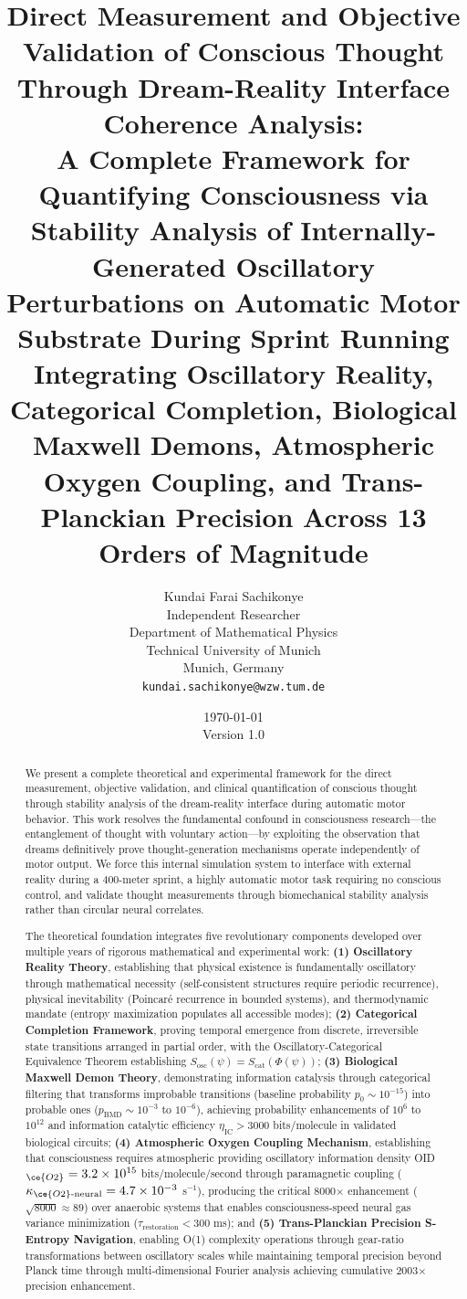 \documentclass[11pt,onecolumn]{article}
\title{\textbf{Direct Measurement and Objective Validation of Conscious Thought Through Dream-Reality Interface Coherence Analysis: \\[0.5em]
A Complete Framework for Quantifying Consciousness via Stability Analysis of Internally-Generated Oscillatory Perturbations on Automatic Motor Substrate During Sprint Running\\[0.5em]
Integrating Oscillatory Reality, Categorical Completion, Biological Maxwell Demons, Atmospheric Oxygen Coupling, and Trans-Planckian Precision Across 13 Orders of Magnitude}}
\author{
Kundai Farai Sachikonye\\
Independent Researcher\\
Department of Mathematical Physics\\
Technical University of Munich\\
Munich, Germany\\
\texttt{kundai.sachikonye@wzw.tum.de}
}
\date{\today\\[1em]Version 1.0}
\begin{document}
\maketitle

\begin{abstract}
We present a complete theoretical and experimental framework for the direct measurement, objective validation, and clinical quantification of conscious thought through stability analysis of the dream-reality interface during automatic motor behavior. This work resolves the fundamental confound in consciousness research---the entanglement of thought with voluntary action---by exploiting the observation that dreams definitively prove thought-generation mechanisms operate independently of motor output. We force this internal simulation system to interface with external reality during a 400-meter sprint, a highly automatic motor task requiring no conscious control, and validate thought measurements through biomechanical stability analysis rather than circular neural correlates.

The theoretical foundation integrates five revolutionary components developed over multiple years of rigorous mathematical and experimental work: \textbf{(1) Oscillatory Reality Theory}, establishing that physical existence is fundamentally oscillatory through mathematical necessity (self-consistent structures require periodic recurrence), physical inevitability (Poincar\'e recurrence in bounded systems), and thermodynamic mandate (entropy maximization populates all accessible modes); \textbf{(2) Categorical Completion Framework}, proving temporal emergence from discrete, irreversible state transitions arranged in partial order, with the Oscillatory-Categorical Equivalence Theorem establishing $S_{\text{osc}}(\psi) = S_{\text{cat}}(\Phi(\psi))$; \textbf{(3) Biological Maxwell Demon Theory}, demonstrating information catalysis through categorical filtering that transforms improbable transitions (baseline probability $p_0 \sim 10^{-15}$) into probable ones ($p_{\text{BMD}} \sim 10^{-3}$ to $10^{-6}$), achieving probability enhancements of $10^6$ to $10^{12}$ and information catalytic efficiency $\eta_{\text{IC}} > 3000$ bits/molecule in validated biological circuits; \textbf{(4) Atmospheric Oxygen Coupling Mechanism}, establishing that consciousness requires atmospheric  providing oscillatory information density OID$_{\ce{O2}} = 3.2 \times 10^{15}$ bits/molecule/second through paramagnetic coupling ($\kappa_{\ce{O2}\text{-neural}} = 4.7 \times 10^{-3}$ s$^{-1}$), producing the critical 8000$\times$ enhancement ($\sqrt{8000} \approx 89$) over anaerobic systems that enables consciousness-speed neural gas variance minimization ($\tau_{\text{restoration}} < 300$ ms); and \textbf{(5) Trans-Planckian Precision S-Entropy Navigation}, enabling O(1) complexity operations through gear-ratio transformations between oscillatory scales while maintaining temporal precision beyond Planck time through multi-dimensional Fourier analysis achieving cumulative 2003$\times$ precision enhancement.


\end{abstract}
\end{document}
